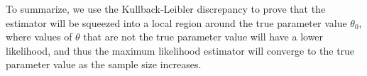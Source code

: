 \documentclass{article}
\theoremstyle{definition}
\theoremstyle{remark}
\begin{document}
To summarize, we use the Kullback-Leibler discrepancy to prove that the estimator will be squeezed into a local region around the true parameter value $\theta_0$, where values of $\theta$ that are not the true parameter value will have a lower likelihood, and thus the maximum likelihood estimator will converge to the true parameter value as the sample size increases.
\end{document}
